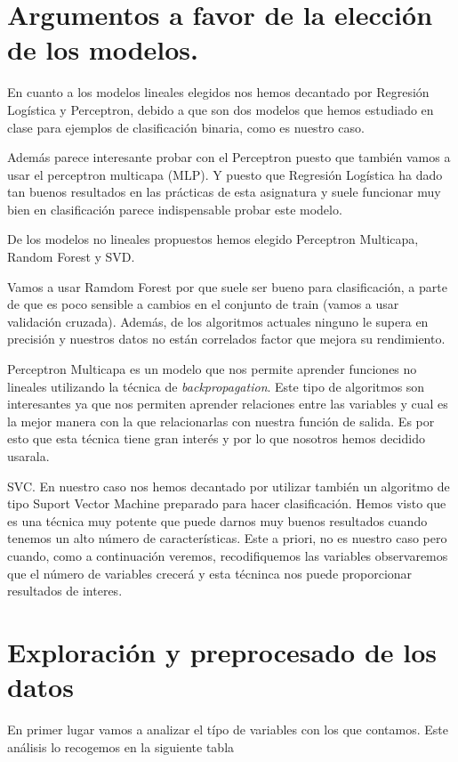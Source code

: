 \documentclass[a4paper,11pt]{article}
\begin{document}
\section{Argumentos a favor de la elección de los modelos.}

En cuanto a los modelos lineales elegidos nos hemos decantado por Regresión
Logística y Perceptron, debido a que son dos modelos que hemos estudiado en
clase para ejemplos de clasificación binaria, como es nuestro caso.  

Además parece interesante probar con el Perceptron puesto que también vamos a
usar el perceptron multicapa (MLP). Y puesto que Regresión Logística ha dado tan
buenos resultados en las prácticas de esta asignatura y suele funcionar muy bien
en clasificación parece indispensable probar este modelo.

De los modelos no lineales propuestos hemos elegido Perceptron Multicapa, Random
Forest y SVD.

Vamos a usar Ramdom Forest por que suele ser bueno para clasificación, a parte
de que es poco sensible a cambios en el conjunto de train (vamos a usar
validación cruzada). Además, de los algoritmos actuales ninguno le supera en
precisión y nuestros datos no están correlados factor que mejora su
rendimiento.

Perceptron Multicapa es un modelo que nos permite aprender funciones no lineales
utilizando la técnica de \textit{backpropagation}. Este tipo de algoritmos son
interesantes ya que nos permiten aprender relaciones entre las variables y cual
es la mejor manera con la que relacionarlas con nuestra función de salida. Es
por esto que esta técnica tiene gran interés y por lo que nosotros hemos
decidido usarala.

SVC. En nuestro caso nos hemos decantado por utilizar también un algoritmo de tipo
Suport Vector Machine preparado para hacer clasificación. Hemos visto que es una 
técnica muy potente que puede darnos muy buenos resultados cuando tenemos un alto 
número de características. Este a priori, no es nuestro caso pero cuando, como a 
continuación veremos, recodifiquemos las variables observaremos que el número 
de variables crecerá y esta técninca nos puede proporcionar resultados de interes.

\section{Exploración y preprocesado de los datos}

En primer lugar vamos a analizar el típo de variables con los que contamos. Este
análisis lo recogemos en la siguiente tabla
\end{document}
